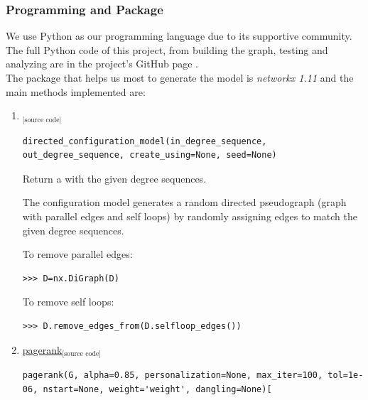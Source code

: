 \documentclass{article}
\begin{document}
		\subsubsection{Programming and Package}
We use Python as our programming language due to its supportive community. The full Python code of this project, from building the graph, testing and analyzing are in the project's GitHub page \cite{git}. \\
The package that helps us most to generate the model is \emph{networkx 1.11} \cite{networkx} and the main methods implemented are:
\begin{enumerate}
\item \href{https://networkx.github.io/documentation/networkx-1.11/reference/generated/networkx.generators.degree_seq.directed_configuration_model.html?highlight=directed%20configuration%20model#networkx.generators.degree_seq.directed_configuration_model}{\text{directed\_configuration\_model}}\href{https://networkx.github.io/documentation/networkx-1.11/_modules/networkx/generators/degree_seq.html#directed_configuration_model}{$_{\text{[source code]}}$}

\begin{lstlisting}
directed_configuration_model(in_degree_sequence, out_degree_sequence, create_using=None, seed=None) 
\end{lstlisting}

Return a  with the given degree sequences.

The configuration model generates a random directed pseudograph (graph with parallel edges and self loops) by randomly assigning edges to match the given degree sequences.

To remove parallel edges:
\begin{lstlisting}
>>> D=nx.DiGraph(D)
\end{lstlisting}
To remove self loops:
\begin{lstlisting}
>>> D.remove_edges_from(D.selfloop_edges())
\end{lstlisting}

\item \href{https://networkx.github.io/documentation/networkx-1.11/reference/generated/networkx.algorithms.link_analysis.pagerank_alg.pagerank.html?highlight=pagerank}{pagerank}\href{https://networkx.github.io/documentation/networkx-1.11/_modules/networkx/algorithms/link_analysis/pagerank_alg.html#pagerank}{$_{\text{[source code]}}$}
\begin{lstlisting}
pagerank(G, alpha=0.85, personalization=None, max_iter=100, tol=1e-06, nstart=None, weight='weight', dangling=None)[
\end{lstlisting}


\end{enumerate}
\end{document}
